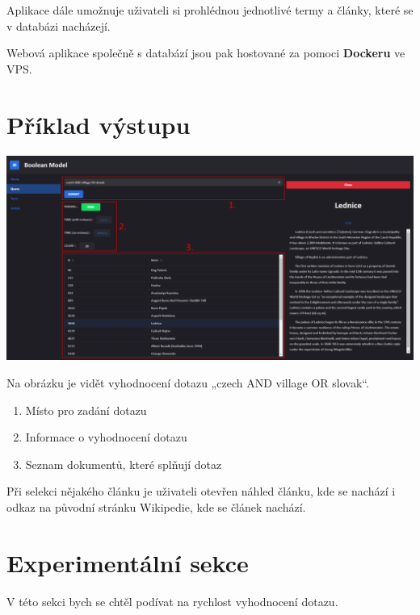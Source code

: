 \documentclass[12pt,a4paper]{article}
\begin{document}
\begin{flushleft}
Aplikace dále umožnuje uživateli si prohlédnou jednotlivé termy a články, které
se v databázi nacházejí.
\end{flushleft}

\begin{flushleft}
Webová aplikace společně s databází jsou pak hostované za pomoci
\textbf{Dockeru} ve VPS.
\end{flushleft}

\section*{Příklad výstupu}

\begin{center}
\includegraphics[width=\textwidth]{./images/result.png}
\end{center}
Na obrázku je vidět vyhodnocení dotazu „czech AND village OR slovak“.

\begin{enumerate}
  \item Místo pro zadání dotazu
  \item Informace o vyhodnocení dotazu
  \item Seznam dokumentů, které splňují dotaz
\end{enumerate}

Při selekci nějakého článku je uživateli otevřen náhled článku, kde se nachází
i odkaz na původní stránku Wikipedie, kde se článek nachází.

\section*{Experimentální sekce}
V této sekci bych se chtěl podívat na rychlost vyhodnocení dotazu.
\end{document}
